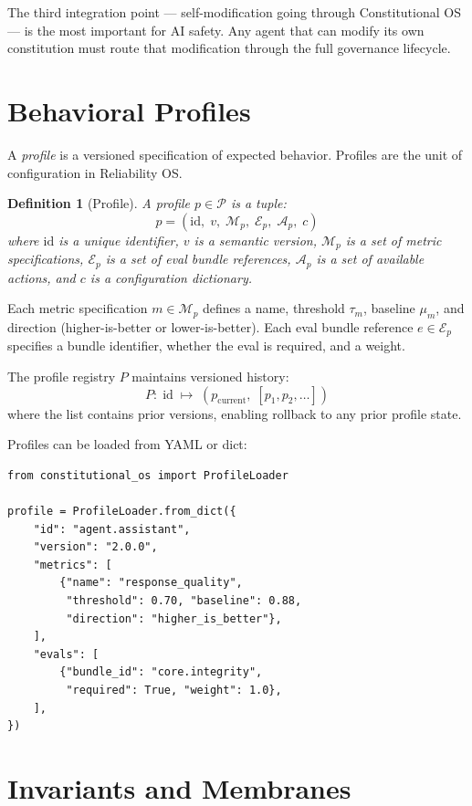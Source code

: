 \documentclass[11pt]{article}
\newtheorem{definition}{Definition}[section]
\begin{document}
The third integration point — self-modification going through
Constitutional OS — is the most important for AI safety.
Any agent that can modify its own constitution must route that
modification through the full governance lifecycle.

\section{Behavioral Profiles}
\label{sec:profiles}

A \emph{profile} is a versioned specification of expected behavior.
Profiles are the unit of configuration in Reliability OS.

\begin{definition}[Profile]
A profile $p \in \mathcal{P}$ is a tuple:
\[
  p = (\mathrm{id},\; v,\; \mathcal{M}_p,\; \mathcal{E}_p,\; \mathcal{A}_p,\; c)
\]
where $\mathrm{id}$ is a unique identifier, $v$ is a semantic
version, $\mathcal{M}_p$ is a set of metric specifications,
$\mathcal{E}_p$ is a set of eval bundle references,
$\mathcal{A}_p$ is a set of available actions, and $c$ is
a configuration dictionary.
\end{definition}

Each metric specification $m \in \mathcal{M}_p$ defines a name,
threshold $\tau_m$, baseline $\mu_m$, and direction
(higher-is-better or lower-is-better). Each eval bundle reference
$e \in \mathcal{E}_p$ specifies a bundle identifier, whether the
eval is required, and a weight.

The profile registry $P$ maintains versioned history:
\[
  P:\; \mathrm{id} \;\mapsto\; (p_{\mathrm{current}},\; [p_1, p_2, \ldots])
\]
where the list contains prior versions, enabling rollback to any
prior profile state.

Profiles can be loaded from YAML or dict:
\begin{lstlisting}
from constitutional_os import ProfileLoader

profile = ProfileLoader.from_dict({
    "id": "agent.assistant",
    "version": "2.0.0",
    "metrics": [
        {"name": "response_quality",
         "threshold": 0.70, "baseline": 0.88,
         "direction": "higher_is_better"},
    ],
    "evals": [
        {"bundle_id": "core.integrity",
         "required": True, "weight": 1.0},
    ],
})
\end{lstlisting}

\section{Invariants and Membranes}
\label{sec:membranes}
\end{document}
